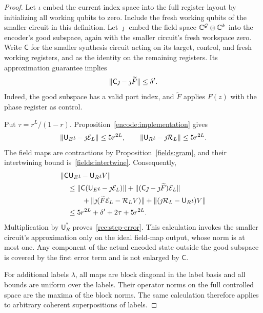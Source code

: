 \begin{proof}
Let $\iota$ embed the current index space into the full register layout by
initializing all working qubits to zero.  Include the fresh working qubits
of the smaller circuit in this definition.  Let $\jmath$ embed the field space
$\mathbb C^{\mathcal G}\otimes\mathbb C^k$ into the encoder's good subspace, again with
the smaller circuit's fresh workspace zero.  Write $\mathsf C$ for the
smaller synthesis circuit acting on its target, control, and fresh working
registers, and as the identity on the remaining registers.  Its approximation
guarantee implies
\begin{equation}\label{rec:restricted-error}
 \lVert \mathsf C\jmath-\jmath\widetilde F\rVert\leq\delta'.
\end{equation}
Indeed, the good subspace has a valid port index, and $\widetilde F$ applies
$F(z)$ with the phase register as control.

Put $\tau=r^L/(1-r)$.  Proposition~\ref{encode:implementation} gives
\[
 \lVert \mathsf U_E\iota-\jmath\mathcal E_L\rVert\leq5r^{2L},
 \qquad
 \lVert \mathsf U_R\iota-\jmath\mathcal R_L\rVert\leq5r^{2L}.
\]
The field maps are contractions by Proposition~\ref{fields:gram}, and their
intertwining bound is~\eqref{fields:intertwine}.  Consequently,
\begin{align*}
 &\lVert \mathsf C\mathsf U_E\iota-\mathsf U_R\iota V\rVert\\
 &\quad\leq
 \lVert \mathsf C(\mathsf U_E\iota-\jmath\mathcal E_L)\rVert
 +\lVert (\mathsf C\jmath-\jmath\widetilde F)\mathcal E_L\rVert\\
 &\qquad\quad
 +\lVert \jmath(\widetilde F\mathcal E_L-\mathcal R_LV)\rVert
 +\lVert (\jmath\mathcal R_L-\mathsf U_R\iota)V\rVert\\
 &\quad\leq5r^{2L}+\delta'+2\tau+5r^{2L}.
\end{align*}
Multiplication by $\mathsf U_R^*$ proves~\eqref{rec:step-error}.
This calculation invokes the smaller circuit's approximation only on the
ideal field-map output, whose norm is at most one.  Any component of the
actual encoded state outside the good subspace is covered by the first
error term and is not enlarged by $\mathsf C$.

For additional labels $\lambda$, all maps are block diagonal in the label
basis and all bounds are uniform over the labels.  Their operator norms on
the full controlled space are the maxima of the block norms.  The same
calculation therefore applies to arbitrary coherent superpositions of labels.
\end{proof}

